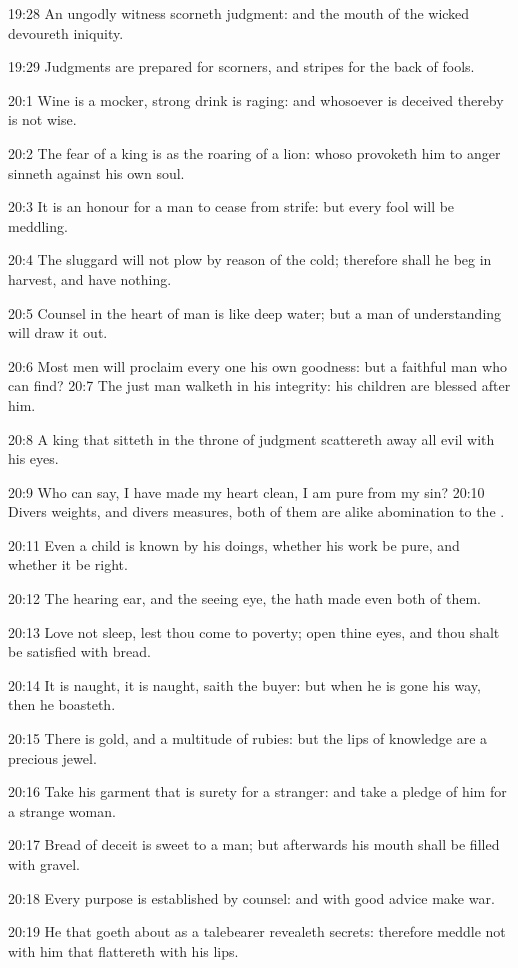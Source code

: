 19:28 An ungodly witness scorneth judgment: and the mouth of the
wicked devoureth iniquity.

19:29 Judgments are prepared for scorners, and stripes for the back of
fools.

20:1 Wine is a mocker, strong drink is raging: and whosoever is
deceived thereby is not wise.

20:2 The fear of a king is as the roaring of a lion: whoso provoketh
him to anger sinneth against his own soul.

20:3 It is an honour for a man to cease from strife: but every fool
will be meddling.

20:4 The sluggard will not plow by reason of the cold; therefore shall
he beg in harvest, and have nothing.

20:5 Counsel in the heart of man is like deep water; but a man of
understanding will draw it out.

20:6 Most men will proclaim every one his own goodness: but a faithful
man who can find?  20:7 The just man walketh in his integrity: his
children are blessed after him.

20:8 A king that sitteth in the throne of judgment scattereth away all
evil with his eyes.

20:9 Who can say, I have made my heart clean, I am pure from my sin?
20:10 Divers weights, and divers measures, both of them are alike
abomination to the \LORD.

20:11 Even a child is known by his doings, whether his work be pure,
and whether it be right.

20:12 The hearing ear, and the seeing eye, the \LORD hath made even
both of them.

20:13 Love not sleep, lest thou come to poverty; open thine eyes, and
thou shalt be satisfied with bread.

20:14 It is naught, it is naught, saith the buyer: but when he is gone
his way, then he boasteth.

20:15 There is gold, and a multitude of rubies: but the lips of
knowledge are a precious jewel.

20:16 Take his garment that is surety for a stranger: and take a
pledge of him for a strange woman.

20:17 Bread of deceit is sweet to a man; but afterwards his mouth
shall be filled with gravel.

20:18 Every purpose is established by counsel: and with good advice
make war.

20:19 He that goeth about as a talebearer revealeth secrets: therefore
meddle not with him that flattereth with his lips.

